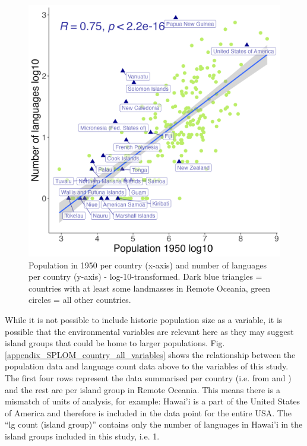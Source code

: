 \documentclass[12pt,letterpaper]{article}
\begin{document}
\begin{figure}[ht]
    \centering
          \includegraphics[width=.7\textwidth]{number_of_languages_vs_pop_1950_log10}
    \caption{Population in 1950 per country (x-axis) and number of languages per country (y-axis) - log-10-transformed. Dark blue triangles = countries with at least some landmasses in Remote Oceania, green circles = all other countries.}
    \label{appendix_fig:un_pop_plot_log10}
    \end{figure}

While it is not possible to include historic population size as a variable, it is possible that the environmental variables are relevant here as they may suggest island groups that could be home to larger populations. Fig. \ref{appendix_SPLOM_country_all_variables} shows the relationship between the population data and language count data above to the variables of this study. The first four rows represent the data summarised per country (i.e. from  \citet{UN_pop} and \citet{glottolog3}) and the rest are per island group in Remote Oceania. This means there is a mismatch of units of analysis, for example: Hawai'i is a part of the United States of America and therefore is included in the data point for the entire USA. The ``lg count (island group)'' contains only the number of languages in Hawai'i in the island groups included in this study, i.e. 1.
\end{document}
